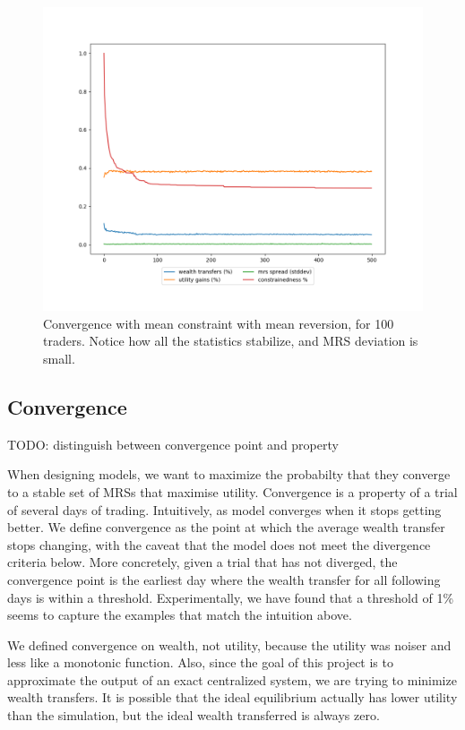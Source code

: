 \documentclass[12pt,a4paper,titlepage]{article}
\begin{document}
\begin{figure}[h]
    \centering
    \includegraphics[width=\textwidth]{seed_5.png}
    \caption{
      Convergence with mean constraint with mean reversion, for 100 traders.
      Notice how all the statistics stabilize, and MRS deviation is small.
    }
    \label{fig:conv}
\end{figure}

\subsection{Convergence}
TODO: distinguish between convergence point and property

When designing models, we want to maximize the probabilty that they converge to a stable set of MRSs that maximise utility.
Convergence is a property of a trial of several days of trading.
Intuitively, as model converges when it stops getting better.
We define convergence as the point at which the average wealth transfer stops changing, with the caveat that the model does not meet the divergence criteria below.
More concretely, given a trial that has not diverged, the convergence point is the earliest day where the wealth transfer for all following days is within a threshold.
Experimentally, we have found that a threshold of 1\% seems to capture the examples that match the intuition above.

We defined convergence on wealth, not utility, because the utility was noiser and less like a monotonic function.
Also, since the goal of this project is to approximate the output of an exact centralized system, we are trying to minimize wealth transfers.
It is possible that the ideal equilibrium actually has lower utility than the simulation, but the ideal wealth transferred is always zero.
\end{document}
